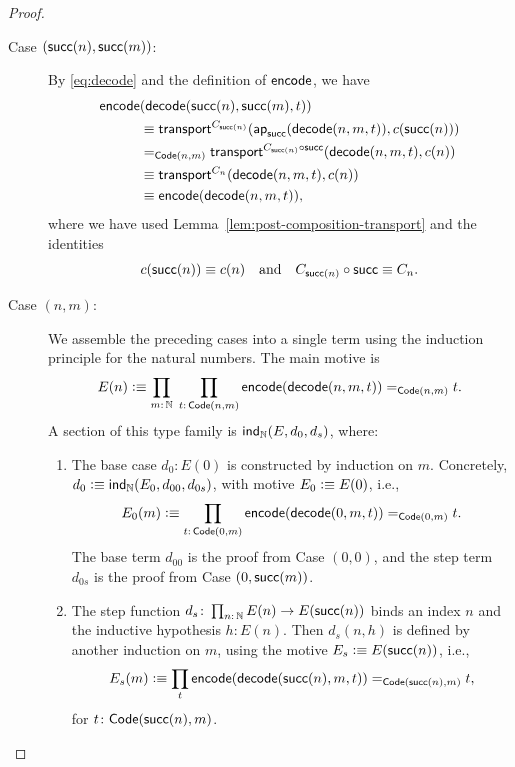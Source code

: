 \begin{proof}
\begin{description}
         \item[Case $(\mathsf{succ}(n),\mathsf{succ}(m))$:] By \eqref{eq:decode} and the definition of $\mathsf{encode}$, we have
         \begin{align*}
            \mathsf{encode}&(\mathsf{decode}(\mathsf{succ}(n),\mathsf{succ}(m),t))\\
                &\equiv\mathsf{transport}^{C_{\mathsf{succ}(n)}}
                    (\mathsf{ap}_{\mathsf{succ}}(\mathsf{decode}(n,m,t)),c(\mathsf{succ}(n)))\\
                &\mathrel{=_{\mathsf{Code}(n,m)}}\mathsf{transport}^{C_{\mathsf{succ}(n)}\circ\mathsf{succ}}
                    (\mathsf{decode}(n,m,t),c(n))\\
                &\equiv\mathsf{transport}^{C_n}
                    (\mathsf{decode}(n,m,t),c(n))\\
                &\equiv\mathsf{encode}(\mathsf{decode}(n,m,t)),
         \end{align*}
         where we have used Lemma~\ref{lem:post-composition-transport} and the identities
         \[
            c(\mathsf{succ}(n))\equiv c(n)
            \quad\text{and}\quad
            C_{\mathsf{succ}(n)}\circ\mathsf{succ}\equiv C_n.
        \]
        \item[Case $(n,m)$:] We assemble the preceding cases into a single term using the induction principle for the natural numbers. The main motive is
        \[
            E(n)\defeq\prod_{m\colon\N}
                \;\prod_{t\colon\fun{Code}(n,m)}\fun{encode}
                    (\fun{decode}(n,m,t))\eq{\fun{Code}(n,m)}t.
        \]
        A section of this type family is $\mathsf{ind}_{\mathbb{N}}(E,d_0,d_s)$, where:
        \begin{enumerate}[-]
            \item The base case $d_0\colon E(0)$ is constructed by induction on $m$. Concretely, $d_0\mathrel{\vcentcolon}\equiv\mathsf{ind}_{\mathbb{N}}(E_0,d_{00},d_{0s})$, with motive $E_0\mathrel{\vcentcolon}\equiv E(0)$, i.e.,
            \[
                E_0(m)\defeq\prod_{t\colon\fun{Code}(0,m)}\fun{encode}(\fun{decode}(0,m,t))\eq{\fun{Code}(0,m)}t.
            \]
            The base term $d_{00}$ is the proof from Case $(0,0)$, and the step term $d_{0s}$ is the proof from Case $(0,\mathsf{succ}(m))$.
            
            \item The step function $d_s\colon\prod_{n\colon\N} E(n)\to E(\fun{succ}(n))$ binds an index $n$ and the inductive hypothesis $h\colon E(n)$. Then $d_s(n,h)$ is defined by another induction on $m$, using the motive $E_s\mathrel{\vcentcolon}\equiv E(\mathsf{succ}(n))$, i.e.,
            \[
                E_s(m)\mathrel{\vcentcolon}\equiv
                    \prod_t
                    \mathsf{encode}(\mathsf{decode}(\mathsf{succ}(n),m,t))\mathrel{=_{\mathsf{Code}(\mathsf{succ}(n),m)}}t,
            \]
            for $t\colon\fun{Code}(\fun{succ}(n),m)$.
            

\end{enumerate}
\end{description}
\end{proof}
